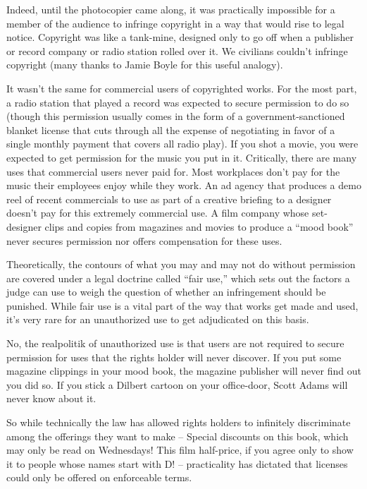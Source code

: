 Indeed, until the photocopier came along, it was practically
impossible for a member of the audience to infringe copyright in a
way that would rise to legal notice. Copyright was like a
tank-mine, designed only to go off when a publisher or record
company or radio station rolled over it. We civilians couldn't
infringe copyright (many thanks to Jamie Boyle for this useful
analogy).

It wasn't the same for commercial users of copyrighted works. For
the most part, a radio station that played a record was expected to
secure permission to do so (though this permission usually comes in
the form of a government-sanctioned blanket license that cuts
through all the expense of negotiating in favor of a single monthly
payment that covers all radio play). If you shot a movie, you were
expected to get permission for the music you put in it. Critically,
there are many uses that commercial users never paid for. Most
workplaces don't pay for the music their employees enjoy while they
work. An ad agency that produces a demo reel of recent commercials
to use as part of a creative briefing to a designer doesn't pay for
this extremely commercial use. A film company whose set-designer
clips and copies from magazines and movies to produce a ``mood book''
never secures permission nor offers compensation for these uses.

Theoretically, the contours of what you may and may not do without
permission are covered under a legal doctrine called ``fair use,''
which sets out the factors a judge can use to weigh the question of
whether an infringement should be punished. While fair use is a
vital part of the way that works get made and used, it's very rare
for an unauthorized use to get adjudicated on this basis.

No, the realpolitik of unauthorized use is that users are not
required to secure permission for uses that the rights holder will
never discover. If you put some magazine clippings in your mood
book, the magazine publisher will never find out you did so. If you
stick a Dilbert cartoon on your office-door, Scott Adams will never
know about it.

So while technically the law has allowed rights holders to
infinitely discriminate among the offerings they want to make --
Special discounts on this book, which may only be read on
Wednesdays! This film half-price, if you agree only to show it to
people whose names start with D! -- practicality has dictated that
licenses could only be offered on enforceable terms.

